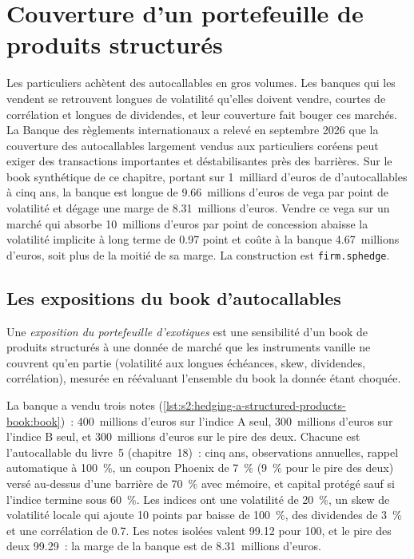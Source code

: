 \chapter{Couverture d'un portefeuille de produits structurés}\label{ch:s2:hedging-a-structured-products-book}

Les particuliers achètent des autocallables en gros volumes. Les banques qui les vendent se retrouvent longues de volatilité qu'elles doivent vendre, courtes de corrélation et longues de
dividendes, et leur couverture fait bouger ces marchés. La Banque des règlements internationaux a relevé en septembre 2026 que la couverture des autocallables largement
vendus aux particuliers coréens peut exiger des transactions importantes et déstabilisantes près des barrières. Sur le book synthétique de ce chapitre, portant sur 1~milliard d'euros de
d'autocallables à cinq ans, la banque est longue de 9.66~millions d'euros de vega par point de volatilité et dégage une marge de 8.31~millions d'euros. Vendre ce vega
sur un marché qui absorbe 10~millions d'euros par point de concession abaisse la volatilité implicite à long terme de 0.97 point et coûte à la banque 4.67~millions d'euros,
soit plus de la moitié de sa marge. La construction est \texttt{firm.sphedge}.

\section{Les expositions du book d'autocallables}

\begin{definition}\label{def:s2:hedging-a-structured-products-book:exposure}
Une \emph{exposition du portefeuille d'exotiques} est une sensibilité d'un book de produits structurés à une donnée de marché que les instruments vanille
ne couvrent qu'en partie (volatilité aux longues échéances, skew, dividendes, corrélation), mesurée en réévaluant l'ensemble du book
la donnée étant choquée.
\end{definition}

La banque a vendu trois notes (\cref{lst:s2:hedging-a-structured-products-book:book})~: 400~millions d'euros sur l'indice A seul, 300~millions d'euros sur l'indice B
seul, et 300~millions d'euros sur le pire des deux. Chacune est l'autocallable du livre~5 (chapitre~18)~: cinq ans, observations annuelles, rappel automatique à 100~\%, un
coupon Phoenix de 7~\% (9~\% pour le pire des deux) versé au-dessus d'une barrière de 70~\% avec mémoire, et capital protégé sauf si l'indice termine sous 60~\%. Les
indices ont une volatilité de 20~\%, un skew de volatilité locale qui ajoute 10 points par baisse de 100~\%, des dividendes de 3~\% et une corrélation de 0.7. Les notes isolées
valent 99.12 pour 100, et le pire des deux 99.29~: la marge de la banque est de 8.31~millions d'euros.

